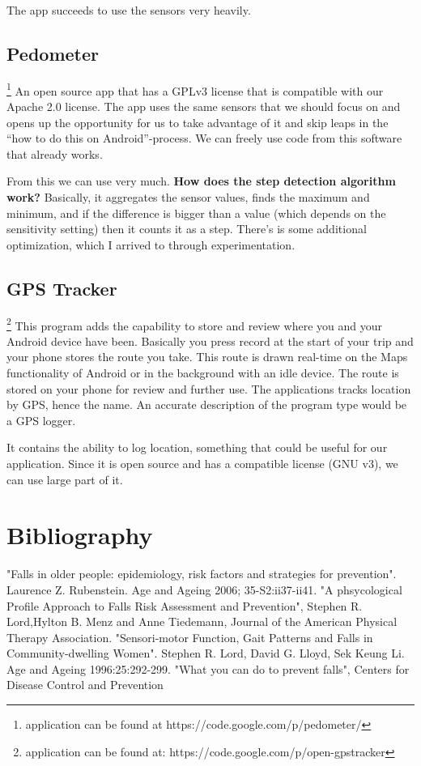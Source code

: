 The app succeeds to use the sensors very heavily.

\subsection{Pedometer}\footnote{application can be found at https://code.google.com/p/pedometer/} 
An open source app that has a GPLv3 license that is compatible with our Apache 2.0 license. The app uses the same sensors that we should focus on and opens up the opportunity for us to take advantage of it and skip leaps in the “how to do this on Android”-process. We can freely use code from this software that already works.

From this we can use very much.
\textbf{How does the step detection algorithm work?}
Basically, it aggregates the sensor values, finds the maximum and minimum, and if the difference is bigger than a value (which depends on the sensitivity setting) then it counts it as a step. There's is some additional optimization, which I arrived to through experimentation.

\subsection{GPS Tracker}\footnote{application can be found at: https://code.google.com/p/open-gpstracker}
This program adds the capability to store and review where you and your Android device have been. Basically you press record at the start of your trip and your phone stores the route you take. This route is drawn real-time on the Maps functionality of Android or in the background with an idle device. The route is stored on your phone for review and further use. The applications tracks location by GPS, hence the name. An accurate description of the program type would be a GPS logger.

It contains the ability to log location, something that could be useful for our application. Since it is open source and has a compatible license (GNU v3), we can use large part of it.

\section{Bibliography}
\begin{thebibliography}{99}


"Falls in older people: epidemiology, risk factors and strategies for prevention". Laurence Z. Rubenstein. Age and Ageing 2006; 35-S2:ii37-ii41.
"A phsycological Profile Approach to Falls Risk Assessment and Prevention", Stephen R. Lord,Hylton B. Menz and Anne Tiedemann, Journal of the American Physical Therapy Association. 
"Sensori-motor Function, Gait Patterns and Falls in Community-dwelling Women". Stephen R. Lord, David G. Lloyd, Sek Keung Li. Age and Ageing 1996:25:292-299.
  "What you can do to prevent falls", Centers for Disease Control and Prevention
  
\end{thebibliography}